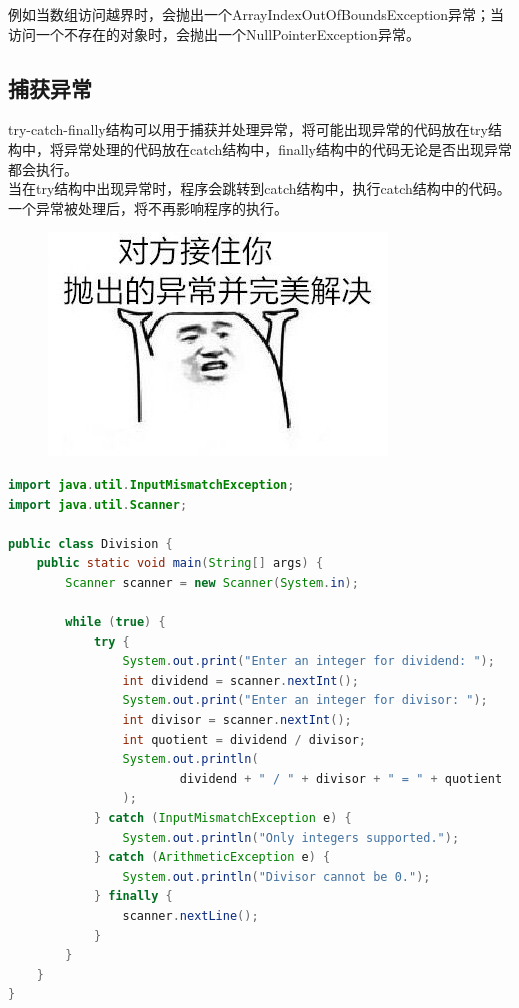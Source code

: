例如当数组访问越界时，会抛出一个ArrayIndexOutOfBoundsException异常；当访问一个不存在的对象时，会抛出一个NullPointerException异常。\\

\subsection{捕获异常}

try-catch-finally结构可以用于捕获并处理异常，将可能出现异常的代码放在try结构中，将异常处理的代码放在catch结构中，finally结构中的代码无论是否出现异常都会执行。\\

当在try结构中出现异常时，程序会跳转到catch结构中，执行catch结构中的代码。一个异常被处理后，将不再影响程序的执行。\\

\begin{figure}[H]
    \centering
    \includegraphics{img/Chapter9/9-1/1.png}
\end{figure}


\begin{lstlisting}[language=Java]
import java.util.InputMismatchException;
import java.util.Scanner;

public class Division {
    public static void main(String[] args) {
        Scanner scanner = new Scanner(System.in);

        while (true) {
            try {
                System.out.print("Enter an integer for dividend: ");
                int dividend = scanner.nextInt();
                System.out.print("Enter an integer for divisor: ");
                int divisor = scanner.nextInt();
                int quotient = dividend / divisor;
                System.out.println(
                        dividend + " / " + divisor + " = " + quotient
                );
            } catch (InputMismatchException e) {
                System.out.println("Only integers supported.");
            } catch (ArithmeticException e) {
                System.out.println("Divisor cannot be 0.");
            } finally {
                scanner.nextLine();
            }
        }
    }
}
\end{lstlisting}


